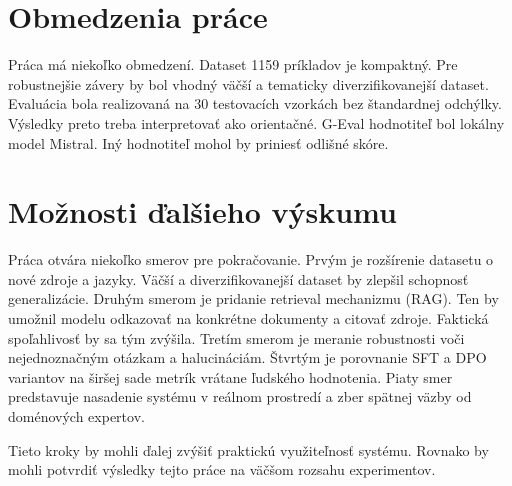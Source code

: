 \section*{Obmedzenia práce}
 
Práca má niekoľko obmedzení. Dataset 1159 príkladov je kompaktný. Pre robustnejšie závery by bol vhodný väčší a tematicky diverzifikovanejší dataset. Evaluácia bola realizovaná na 30 testovacích vzorkách bez štandardnej odchýlky. Výsledky preto treba interpretovať ako orientačné. G-Eval hodnotiteľ bol lokálny model Mistral. Iný hodnotiteľ mohol by priniesť odlišné skóre.
 
\section*{Možnosti ďalšieho výskumu}
 
Práca otvára niekoľko smerov pre pokračovanie. Prvým je rozšírenie datasetu o nové zdroje a jazyky. Väčší a diverzifikovanejší dataset by zlepšil schopnosť generalizácie. Druhým smerom je pridanie retrieval mechanizmu (RAG). Ten by umožnil modelu odkazovať na konkrétne dokumenty a citovať zdroje. Faktická spoľahlivosť by sa tým zvýšila. Tretím smerom je meranie robustnosti voči nejednoznačným otázkam a halucináciám. Štvrtým je porovnanie SFT a DPO variantov na širšej sade metrík vrátane ľudského hodnotenia. Piaty smer predstavuje nasadenie systému v reálnom prostredí a zber spätnej väzby od doménových expertov.
 
Tieto kroky by mohli ďalej zvýšiť praktickú využiteľnosť systému. Rovnako by mohli potvrdiť výsledky tejto práce na väčšom rozsahu experimentov.